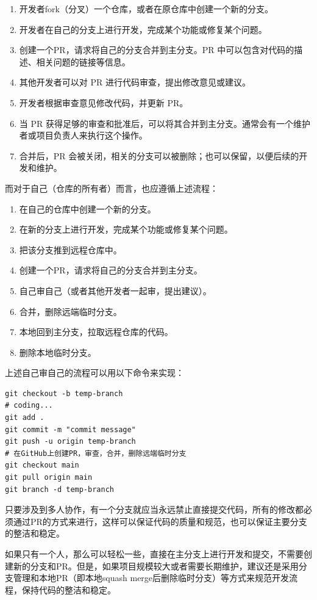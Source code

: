 \begin{enumerate}
  \item 开发者fork（分叉）一个仓库，或者在原仓库中创建一个新的分支。
  \item 开发者在自己的分支上进行开发，完成某个功能或修复某个问题。
  \item 创建一个PR，请求将自己的分支合并到主分支。PR 中可以包含对代码的描述、相关问题的链接等信息。
  \item 其他开发者可以对 PR 进行代码审查，提出修改意见或建议。
  \item 开发者根据审查意见修改代码，并更新 PR。
  \item 当 PR 获得足够的审查和批准后，可以将其合并到主分支。通常会有一个维护者或项目负责人来执行这个操作。
  \item 合并后，PR 会被关闭，相关的分支可以被删除；也可以保留，以便后续的开发和维护。
\end{enumerate}

而对于自己（仓库的所有者）而言，也应遵循上述流程：
\begin{enumerate}
  \item 在自己的仓库中创建一个新的分支。
  \item 在新的分支上进行开发，完成某个功能或修复某个问题。
  \item 把该分支推到远程仓库中。
  \item 创建一个PR，请求将自己的分支合并到主分支。
  \item 自己审自己（或者其他开发者一起审，提出建议）。
  \item 合并，删除远端临时分支。
  \item 本地回到主分支，拉取远程仓库的代码。
  \item 删除本地临时分支。
\end{enumerate}

上述自己审自己的流程可以用以下命令来实现：
\begin{verbatim}
git checkout -b temp-branch
# coding...
git add .
git commit -m "commit message"
git push -u origin temp-branch
# 在GitHub上创建PR，审查，合并，删除远端临时分支
git checkout main
git pull origin main
git branch -d temp-branch
\end{verbatim}
只要涉及到多人协作，有一个分支就应当永远禁止直接提交代码，所有的修改都必须通过PR的方式来进行，这样可以保证代码的质量和规范，也可以保证主要分支的整洁和稳定。

如果只有一个人，那么可以轻松一些，直接在主分支上进行开发和提交，不需要创建新的分支和PR。但是，如果项目规模较大或者需要长期维护，建议还是采用分支管理和本地PR（即本地squash merge后删除临时分支）等方式来规范开发流程，保持代码的整洁和稳定。

